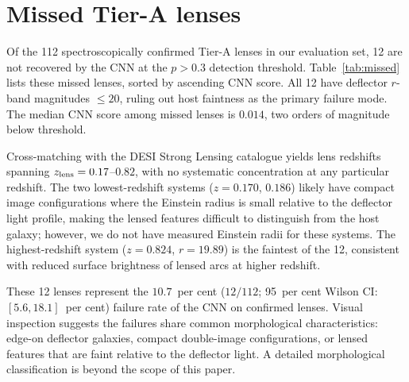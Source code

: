 \documentclass[fleqn,usenatbib]{rasti}
\begin{document}
\section{Missed Tier-A lenses}
\label{app:missed}

Of the 112 spectroscopically confirmed Tier-A lenses in our evaluation set, 12 are not recovered by the CNN at the $p > 0.3$ detection threshold.  Table~\ref{tab:missed} lists these missed lenses, sorted by ascending CNN score.  All 12 have deflector $r$-band magnitudes $\leq 20$, ruling out host faintness as the primary failure mode.  The median CNN score among missed lenses is $0.014$, two orders of magnitude below threshold.

Cross-matching with the DESI Strong Lensing catalogue yields lens redshifts spanning $z_{\rm lens} = 0.17$--$0.82$, with no systematic concentration at any particular redshift.  The two lowest-redshift systems ($z = 0.170$, $0.186$) likely have compact image configurations where the Einstein radius is small relative to the deflector light profile, making the lensed features difficult to distinguish from the host galaxy; however, we do not have measured Einstein radii for these systems.  The highest-redshift system ($z = 0.824$, $r = 19.89$) is the faintest of the 12, consistent with reduced surface brightness of lensed arcs at higher redshift.

These 12 lenses represent the $10.7$~per cent ($12/112$; 95~per cent Wilson CI: $[5.6, 18.1]$~per cent) failure rate of the CNN on confirmed lenses.  Visual inspection suggests the failures share common morphological characteristics: edge-on deflector galaxies, compact double-image configurations, or lensed features that are faint relative to the deflector light.  A detailed morphological classification is beyond the scope of this paper.
\end{document}

